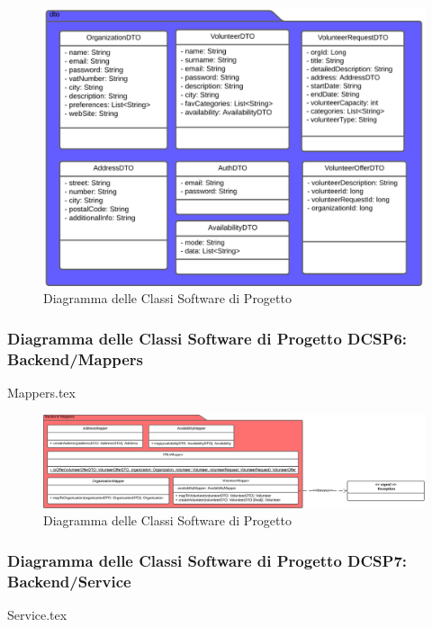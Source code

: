 \documentclass[12pt]{article}
\begin{document}
\begin{figure}[H]
    \includegraphics[width=\textwidth, height=\textheight,keepaspectratio]{Immagini/DCSP/Iterazione 1/Backend/DCSPDTO.png}
        \caption{Diagramma delle Classi Software di Progetto}
        \label{fig:diagrammaDCSP5}
\end{figure}

\subsubsection{Diagramma delle Classi Software di Progetto DCSP6: Backend/Mappers}
{Mappers.tex}

\begin{figure}[H]
    \includegraphics[width=\textwidth, height=\textheight,keepaspectratio]{Immagini/DCSP/Iterazione 1/Backend/DCSPMappers.png}
        \caption{Diagramma delle Classi Software di Progetto}
        \label{fig:diagrammaDCSP6}
\end{figure}

\subsubsection{Diagramma delle Classi Software di Progetto DCSP7: Backend/Service}
{Service.tex}
\end{document}
